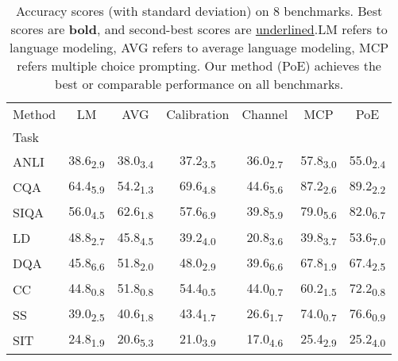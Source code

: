 \begin{table}[h]
\centering
\caption{Accuracy scores (with standard deviation) on 8 benchmarks. Best scores are \textbf{bold}, and second-best scores are \underline{underlined}.LM refers to language modeling, AVG refers to average language modeling, MCP refers multiple choice prompting. Our method (PoE) achieves the best or comparable performance on all benchmarks.}
\label{tab:main_exp}
\begin{tabular}{l|c|c|c|c|c|c}
Method & LM & AVG & Calibration & Channel & MCP & PoE \\
Task &  &  &  &  &  &  \\
ANLI & 38.6\textsubscript{2.9} & 38.0\textsubscript{3.4} & 37.2\textsubscript{3.5} & 36.0\textsubscript{2.7} & 57.8\textsubscript{3.0} & 55.0\textsubscript{2.4} \\
CQA & 64.4\textsubscript{5.9} & 54.2\textsubscript{1.3} & 69.6\textsubscript{4.8} & 44.6\textsubscript{5.6} & 87.2\textsubscript{2.6} & 89.2\textsubscript{2.2} \\
SIQA & 56.0\textsubscript{4.5} & 62.6\textsubscript{1.8} & 57.6\textsubscript{6.9} & 39.8\textsubscript{5.9} & 79.0\textsubscript{5.6} & 82.0\textsubscript{6.7} \\
LD & 48.8\textsubscript{2.7} & 45.8\textsubscript{4.5} & 39.2\textsubscript{4.0} & 20.8\textsubscript{3.6} & 39.8\textsubscript{3.7} & 53.6\textsubscript{7.0} \\
DQA & 45.8\textsubscript{6.6} & 51.8\textsubscript{2.0} & 48.0\textsubscript{2.9} & 39.6\textsubscript{6.6} & 67.8\textsubscript{1.9} & 67.4\textsubscript{2.5} \\
CC & 44.8\textsubscript{0.8} & 51.8\textsubscript{0.8} & 54.4\textsubscript{0.5} & 44.0\textsubscript{0.7} & 60.2\textsubscript{1.5} & 72.2\textsubscript{0.8} \\
SS & 39.0\textsubscript{2.5} & 40.6\textsubscript{1.8} & 43.4\textsubscript{1.7} & 26.6\textsubscript{1.7} & 74.0\textsubscript{0.7} & 76.6\textsubscript{0.9} \\
SIT & 24.8\textsubscript{1.9} & 20.6\textsubscript{5.3} & 21.0\textsubscript{3.9} & 17.0\textsubscript{4.6} & 25.4\textsubscript{2.9} & 25.2\textsubscript{4.0} \\
\end{tabular}
\end{table}

